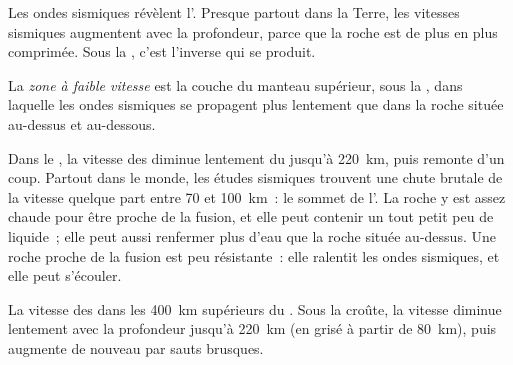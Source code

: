 Les ondes sismiques révèlent l'. Presque partout dans la Terre,
les vitesses sismiques augmentent avec la profondeur, parce que la roche est
de plus en plus comprimée. Sous la , c'est l'inverse qui se
produit.

\begin{definition}\label{def:g11:lithosphere-asthenosphere:lvz}
La \emph{zone à faible vitesse}
est la couche du manteau supérieur, sous la , dans
laquelle les ondes sismiques se propagent plus lentement que dans la roche
située au-dessus et au-dessous.
\end{definition}

Dans le , la vitesse des  diminue
lentement du  jusqu'à \qty{220}{km}, puis remonte d'un coup. Partout dans
le monde, les études sismiques trouvent une chute brutale de la vitesse
quelque part entre 70 et \qty{100}{km}~: le sommet de l'. La
roche y est assez chaude pour être proche de la fusion, et elle peut
contenir un tout petit peu de liquide~; elle peut aussi renfermer plus d'eau
que la roche située au-dessus. Une roche proche de la fusion est peu
résistante~: elle ralentit les ondes sismiques, et elle peut s'écouler.

\begin{omfigure}

{\small La vitesse des  dans les \qty{400}{km} supérieurs du . Sous la croûte, la vitesse diminue lentement avec la
profondeur jusqu'à \qty{220}{km} (en grisé à partir de \qty{80}{km}), puis
augmente de nouveau par sauts brusques.}
\end{omfigure}

